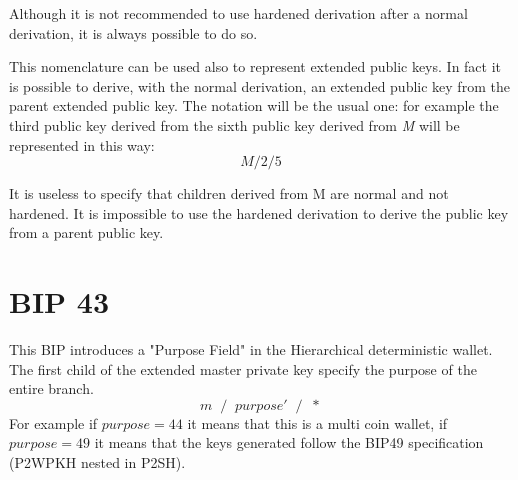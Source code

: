 \begin{remark}
	Although it is not recommended to use hardened derivation after a normal derivation, it is always possible to do so.
\end{remark}
This nomenclature can be used also to represent extended public keys. In fact it is possible to derive, with the normal derivation, an extended public key from the parent extended public key. The notation will be the usual one: for example the third public key derived from the sixth public key derived from \textit{M} will be represented in this way:
\begin{equation*}
M /2/5
\end{equation*}

\begin{remark}
It is useless to specify that children derived from M are normal and not hardened. It is impossible to use the hardened derivation to derive the public key from a parent public key.
\end{remark}

  
\section{BIP 43}
This BIP introduces a "Purpose Field" in the Hierarchical deterministic wallet. The first child of the extended master private key specify the purpose of the entire branch.
\begin{equation*}
m\; \;/\;\; purpose'\;\; /\;\; *
\end{equation*}
For example if $purpose=44$ it means that this is a multi coin wallet, if $purpose=49$ it means that the keys generated follow the BIP49 specification (P2WPKH nested in P2SH).

